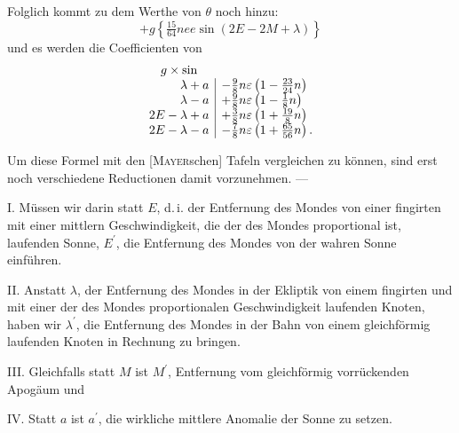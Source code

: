 \noindent Folglich kommt zu dem Werthe von \(\theta\) noch hinzu:
\[
+g\left\{\tfrac{15}{64}nee\sin(2E-2M+\lambda)\right\}
\]
\noindent und es werden die Coefficienten von
\[
\begin{array}{r|l}
\multicolumn{1}{c}{g\times\sin}&\\
\lambda+a&-\tfrac98n\varepsilon\left(1-\tfrac{23}{24}n\right)\\
\lambda-a&+\tfrac98n\varepsilon\left(1-\tfrac18n\right)\\
2E-\lambda+a&+\tfrac38n\varepsilon\left(1+\tfrac{19}{8}n\right)\\
2E-\lambda-a&-\tfrac78n\varepsilon\left(1+\tfrac{65}{56}n\right).
\end{array}
\]
\par\noindent\hspace*{\parindent}Um diese Formel mit den [\textsc{Mayer}schen] Tafeln vergleichen zu können,
sind erst noch verschiedene Reductionen damit vorzunehmen. —

\par\noindent\hspace*{\parindent}I. Müssen wir darin statt \(E\), d.\,i. der Entfernung des Mondes von einer
fingirten mit einer mittlern Geschwindigkeit, die der des Mondes proportional
ist, laufenden Sonne, \(E^{\prime}\), die Entfernung des Mondes von der wahren Sonne
einführen.

\par\noindent\hspace*{\parindent}II. Anstatt \(\lambda\), der Entfernung des Mondes in der Ekliptik von einem
fingirten und mit einer der des Mondes proportionalen Geschwindigkeit
laufenden Knoten, haben wir \(\lambda^{\prime}\), die Entfernung des Mondes in der Bahn
von einem gleichförmig laufenden Knoten in Rechnung zu bringen.

\par\noindent\hspace*{\parindent}III. Gleichfalls statt \(M\) ist \(M^{\prime}\), Entfernung vom gleichförmig vorrückenden
Apogäum und

\par\noindent\hspace*{\parindent}IV. Statt \(a\) ist \(a^{\prime}\), die wirkliche mittlere Anomalie der Sonne zu setzen.

